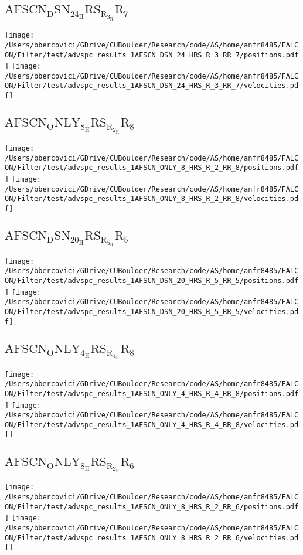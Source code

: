 \subsection{$\mathrm{AFSCN_DSN_24_HRS_R_3_RR_7}$}
\texttt{[image: /Users/bbercovici/GDrive/CUBoulder/Research/code/AS/home/anfr8485/FALCON/Filter/test/advspc\_results\_1AFSCN\_DSN\_24\_HRS\_R\_3\_RR\_7/positions.pdf]}
\texttt{[image: /Users/bbercovici/GDrive/CUBoulder/Research/code/AS/home/anfr8485/FALCON/Filter/test/advspc\_results\_1AFSCN\_DSN\_24\_HRS\_R\_3\_RR\_7/velocities.pdf]}
\subsection{$\mathrm{AFSCN_ONLY_8_HRS_R_2_RR_8}$}
\texttt{[image: /Users/bbercovici/GDrive/CUBoulder/Research/code/AS/home/anfr8485/FALCON/Filter/test/advspc\_results\_1AFSCN\_ONLY\_8\_HRS\_R\_2\_RR\_8/positions.pdf]}
\texttt{[image: /Users/bbercovici/GDrive/CUBoulder/Research/code/AS/home/anfr8485/FALCON/Filter/test/advspc\_results\_1AFSCN\_ONLY\_8\_HRS\_R\_2\_RR\_8/velocities.pdf]}
\subsection{$\mathrm{AFSCN_DSN_20_HRS_R_5_RR_5}$}
\texttt{[image: /Users/bbercovici/GDrive/CUBoulder/Research/code/AS/home/anfr8485/FALCON/Filter/test/advspc\_results\_1AFSCN\_DSN\_20\_HRS\_R\_5\_RR\_5/positions.pdf]}
\texttt{[image: /Users/bbercovici/GDrive/CUBoulder/Research/code/AS/home/anfr8485/FALCON/Filter/test/advspc\_results\_1AFSCN\_DSN\_20\_HRS\_R\_5\_RR\_5/velocities.pdf]}
\subsection{$\mathrm{AFSCN_ONLY_4_HRS_R_4_RR_8}$}
\texttt{[image: /Users/bbercovici/GDrive/CUBoulder/Research/code/AS/home/anfr8485/FALCON/Filter/test/advspc\_results\_1AFSCN\_ONLY\_4\_HRS\_R\_4\_RR\_8/positions.pdf]}
\texttt{[image: /Users/bbercovici/GDrive/CUBoulder/Research/code/AS/home/anfr8485/FALCON/Filter/test/advspc\_results\_1AFSCN\_ONLY\_4\_HRS\_R\_4\_RR\_8/velocities.pdf]}
\subsection{$\mathrm{AFSCN_ONLY_8_HRS_R_2_RR_6}$}
\texttt{[image: /Users/bbercovici/GDrive/CUBoulder/Research/code/AS/home/anfr8485/FALCON/Filter/test/advspc\_results\_1AFSCN\_ONLY\_8\_HRS\_R\_2\_RR\_6/positions.pdf]}
\texttt{[image: /Users/bbercovici/GDrive/CUBoulder/Research/code/AS/home/anfr8485/FALCON/Filter/test/advspc\_results\_1AFSCN\_ONLY\_8\_HRS\_R\_2\_RR\_6/velocities.pdf]}
